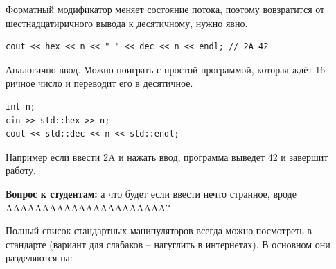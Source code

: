\documentclass[a4paper,12pt,oneside]{book}
\newif\ifanswers
\begin{document}
Форматный модификатор меняет состояние потока, поэтому вовзратится от шестнадцатиричного вывода к десятичному, нужно явно.

\begin{lstlisting}
cout << hex << n << " " << dec << n << endl; // 2A 42
\end{lstlisting}

Аналогично ввод. Можно поиграть с простой программой, которая ждёт 16-ричное число и переводит его в десятичное.

\begin{lstlisting}
int n;
cin >> std::hex >> n;
cout << std::dec << n << std::endl;
\end{lstlisting}

Например если ввести 2A и нажать ввод, программа выведет 42 и завершит работу.

\textbf{Вопрос к студентам:} а что будет если ввести нечто странное, вроде AAAAAAAAAAAAAAAAAAAAAA?

\ifanswers
Будет поведение, зависящее от реализации. Как вариант вывод MAXINT, то есть чего-то вроде 2147483647.
\fi

Полный список стандартных манипуляторов всегда можно посмотреть в стандарте (вариант для слабаков -- нагуглить в интернетах). В основном они разделяются на:
\end{document}

